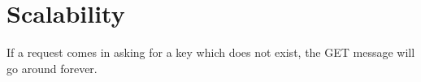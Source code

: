 \section{Scalability}
If a request comes in asking for a key which does not exist, the GET message will go around forever.